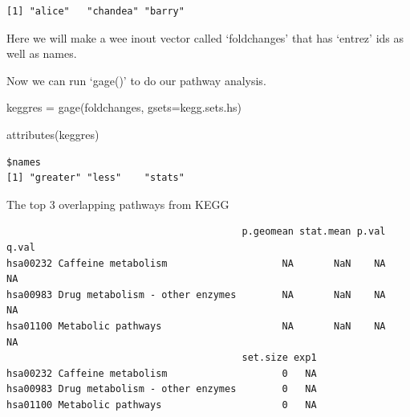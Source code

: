 \documentclass[
  letterpaper,
  DIV=11,
  numbers=noendperiod]{scrartcl}
\newenvironment{Shaded}{\begin{snugshade}}{\end{snugshade}}
\newcommand{\AttributeTok}[1]{\textcolor[rgb]{0.40,0.45,0.13}{#1}}
\newcommand{\DecValTok}[1]{\textcolor[rgb]{0.68,0.00,0.00}{#1}}
\newcommand{\FunctionTok}[1]{\textcolor[rgb]{0.28,0.35,0.67}{#1}}
\newcommand{\NormalTok}[1]{\textcolor[rgb]{0.00,0.23,0.31}{#1}}
\newcommand{\OtherTok}[1]{\textcolor[rgb]{0.00,0.23,0.31}{#1}}
\newcommand{\SpecialCharTok}[1]{\textcolor[rgb]{0.37,0.37,0.37}{#1}}
\begin{document}
\begin{verbatim}
[1] "alice"   "chandea" "barry"  
\end{verbatim}

Here we will make a wee inout vector called `foldchanges' that has
`entrez' ids as well as names.

\begin{Shaded}
\end{Shaded}

Now we can run `gage()' to do our pathway analysis.

\begin{Shaded}
\begin{Highlighting}[]
\NormalTok{keggres }\OtherTok{=} \FunctionTok{gage}\NormalTok{(foldchanges, }\AttributeTok{gsets=}\NormalTok{kegg.sets.hs)}
\end{Highlighting}
\end{Shaded}

\begin{Shaded}
\begin{Highlighting}[]
\FunctionTok{attributes}\NormalTok{(keggres)}
\end{Highlighting}
\end{Shaded}

\begin{verbatim}
$names
[1] "greater" "less"    "stats"  
\end{verbatim}

The top 3 overlapping pathways from KEGG

\begin{Shaded}
\end{Shaded}

\begin{verbatim}
                                         p.geomean stat.mean p.val q.val
hsa00232 Caffeine metabolism                    NA       NaN    NA    NA
hsa00983 Drug metabolism - other enzymes        NA       NaN    NA    NA
hsa01100 Metabolic pathways                     NA       NaN    NA    NA
                                         set.size exp1
hsa00232 Caffeine metabolism                    0   NA
hsa00983 Drug metabolism - other enzymes        0   NA
hsa01100 Metabolic pathways                     0   NA
\end{verbatim}
\end{document}
